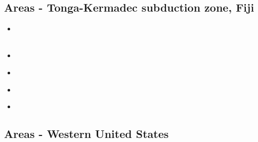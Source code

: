 \subsection{Areas - Tonga-Kermadec subduction zone, Fiji }

\begin{scriptsize}
\begin{itemize}
\item[\twothousandthree] 
\textcite{bigs03} \\
\textcite{bigu03} \\
\item[\twothousandsix] 
\textcite{zhpy06} \\
\item[\twothousandsixteen] 
\textcite{chff16} \\
\item[\twothousandseventeen] 
\textcite{wewv17} \\
\item[\twothousandtwentyone] 
\textcite{ligl21} 
\end{itemize}
\end{scriptsize}

\subsection{Areas - Western United States}

